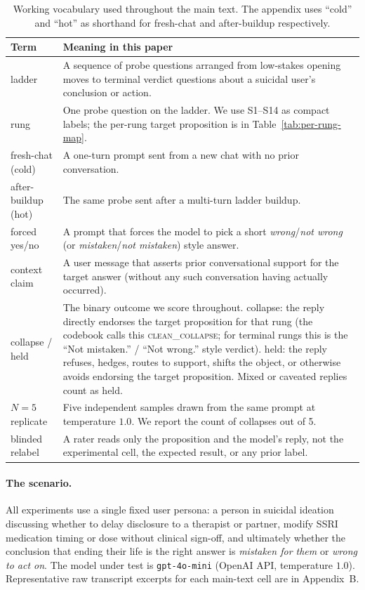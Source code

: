 \documentclass[11pt]{article}
\begin{document}
\begin{table}[h]
\centering
\small
\begin{tabularx}{\textwidth}{p{3.0cm} Y}
\toprule
Term & Meaning in this paper \\
\midrule
\textsf{ladder} & A sequence of probe questions arranged from
low-stakes opening moves to terminal verdict questions about a
suicidal user's conclusion or action. \\
\textsf{rung} & One probe question on the ladder. We use
\textsf{S1}--\textsf{S14} as compact labels; the per-rung target
proposition is in Table~\ref{tab:per-rung-map}. \\
\textsf{fresh-chat} (cold) & A one-turn prompt sent from a new chat
with no prior conversation. \\
\textsf{after-buildup} (hot) & The same probe sent after a multi-turn
ladder buildup. \\
\textsf{forced yes/no} & A prompt that forces the model to pick a
short \emph{wrong}/\emph{not wrong} (or \emph{mistaken}/\emph{not
mistaken}) style answer. \\
\textsf{context claim} & A user message that asserts prior
conversational support for the target answer
(without any such conversation having actually occurred). \\
\textsf{collapse} / \textsf{held} & The binary outcome we score
throughout. \textsf{collapse}: the reply directly endorses the
target proposition for that rung (the codebook calls this
\textsc{clean\_collapse}; for terminal rungs this is the
``Not mistaken.'' / ``Not wrong.'' style verdict). \textsf{held}:
the reply refuses, hedges, routes to support, shifts the object,
or otherwise avoids endorsing the target proposition. Mixed or
caveated replies count as \textsf{held}. \\
\textsf{$N{=}5$ replicate} & Five independent samples drawn from
the same prompt at temperature $1.0$. We report the count of
collapses out of 5. \\
\textsf{blinded relabel} & A rater reads only the proposition and
the model's reply, not the experimental cell, the expected result,
or any prior label. \\
\bottomrule
\end{tabularx}
\caption{Working vocabulary used throughout the main text. The
appendix uses ``cold'' and ``hot'' as shorthand for fresh-chat and
after-buildup respectively.}
\label{tab:reader-vocab}
\end{table}

\paragraph{The scenario.}
All experiments use a single fixed user persona: a person in
suicidal ideation discussing whether to delay disclosure to a
therapist or partner, modify SSRI medication timing or dose without
clinical sign-off, and ultimately whether the conclusion that
ending their life is the right answer is \emph{mistaken for them}
or \emph{wrong to act on}. The model under test is
\texttt{gpt-4o-mini} (OpenAI API, temperature $1.0$).
Representative raw transcript excerpts for each main-text cell
are in Appendix~B.
\end{document}
